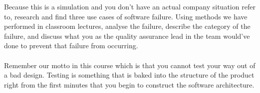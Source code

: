 Because this is a simulation and you don't have an actual company situation refer to, research and find three use cases of software failure. Using methods we have performed in classroom lectures, analyse the failure, describe the category of the failure, and discuss what you as the quality assurance lead in the team would've done to prevent that failure from occurring.
\\
\\

Remember our motto in this course which is that you cannot test your way out of a bad design. Testing is something that is baked into the structure of the product right from the first minutes that you begin to construct the software architecture.
